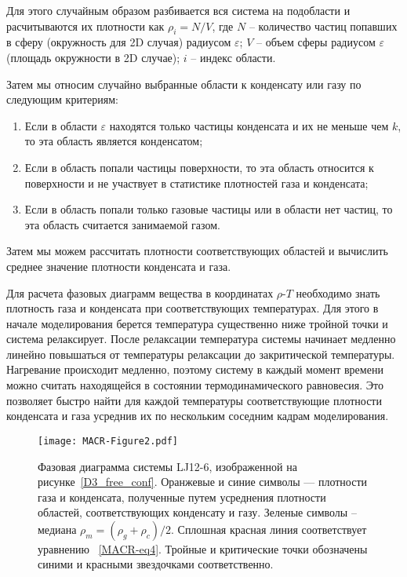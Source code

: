 Для этого случайным образом разбивается вся система на подобласти и расчитываются их плотности как $\rho_i = N / V$, где $N$ -- количество частиц попавших в сферу (окружность для 2D случая) радиусом $\varepsilon$; $V$ -- объем сферы радиусом $\varepsilon$ (площадь окружности в 2D случае); $i$ -- индекс области.

Затем мы относим случайно выбранные области к конденсату или газу по следующим критериям:
\begin{enumerate}
    \item Если в области $\varepsilon$ находятся только частицы конденсата и их не меньше чем $k$, то эта область является конденсатом;
    \item Если в область попали частицы поверхности, то эта область относится к поверхности и не участвует в статистике плотностей газа и конденсата;
    \item Если в область попали только газовые частицы или в области нет частиц, то эта область считается занимаемой газом.
\end{enumerate}
Затем мы можем рассчитать плотности соответствующих областей и вычислить среднее значение плотности конденсата и газа.

Для расчета фазовых диаграмм вещества в координатах $\rho$-$T$ необходимо знать плотность газа и конденсата при соответствующих температурах.
Для этого в начале моделирования берется температура существенно ниже тройной точки и система релаксирует.
После релаксации температура системы начинает медленно линейно повышаться от температуры релаксации до закритической температуры.
Нагревание происходит медленно, поэтому систему в каждый момент времени можно считать находящейся в состоянии термодинамического равновесия.
Это позволяет быстро найти для каждой температуры соответствующие плотности конденсата и газа усреднив их по нескольким соседним кадрам моделирования.

\begin{figure}[!t]
    \centering
    \texttt{[image: MACR-Figure2.pdf]}
    \caption{Фазовая диаграмма системы LJ12-6, изображенной на рисунке~\ref{D3_free_conf}.
    Оранжевые и синие символы — плотности газа и конденсата, полученные путем усреднения плотности областей, соответствующих конденсату и газу. Зеленые символы -- медиана $\rho_m=(\rho_g+\rho_c)/2$.
    Сплошная красная линия соответствует уравнению ~\eqref{MACR-eq4}.
    Тройные и критические точки обозначены синими и красными звездочками соответственно.}
    \label{phase_diagram}
\end{figure}



